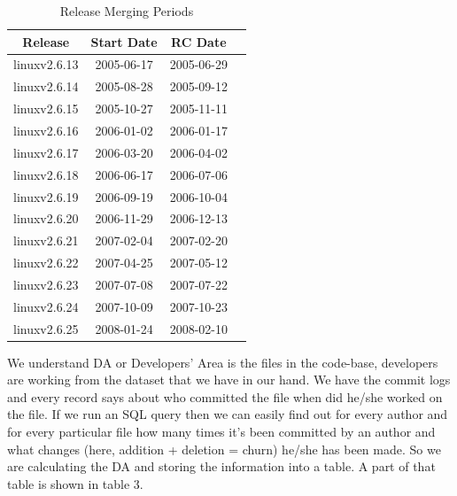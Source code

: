 \documentclass{acm_proc_article-sp}
\begin{document}
\begin{table}[ht]
\caption{Release Merging Periods}  %
\centering 						%
\begin{tabular}{c c c c}				%
\hline\hline						%
Release 			& Start Date		& RC Date \\ [0.5ex]
\hline 							%
linuxv2.6.13		& 2005-06-17	& 2005-06-29 \\
linuxv2.6.14		& 2005-08-28	& 2005-09-12 \\
linuxv2.6.15		& 2005-10-27	& 2005-11-11 \\
linuxv2.6.16		& 2006-01-02	& 2006-01-17 \\
linuxv2.6.17		& 2006-03-20	& 2006-04-02 \\
linuxv2.6.18		& 2006-06-17	& 2006-07-06 \\
linuxv2.6.19		& 2006-09-19	& 2006-10-04 \\
linuxv2.6.20  		& 2006-11-29	& 2006-12-13 \\
linuxv2.6.21		& 2007-02-04	& 2007-02-20 \\
linuxv2.6.22		& 2007-04-25	& 2007-05-12 \\
linuxv2.6.23		& 2007-07-08	& 2007-07-22 \\
linuxv2.6.24		& 2007-10-09	& 2007-10-23 \\
linuxv2.6.25		& 2008-01-24	& 2008-02-10 \\
[1ex]							%
\hline 							%
\end{tabular}
\label{table:nonlin} 				%
\end{table}

We understand DA or Developers' Area is the files in the code-base, developers are working from the dataset that we have in our hand. We have the commit logs and every record says about who committed the file when did he/she worked on the file. If we run an SQL query then we can easily find out for every author and for every particular file how many times it's been committed by an author and what changes (here, addition + deletion = churn) he/she has been made. So we are calculating the DA and storing the information into a table. A part of that table is shown in table 3.
\end{document}
